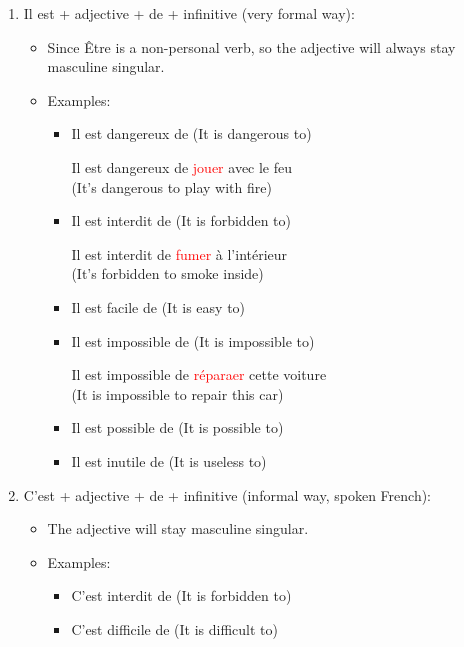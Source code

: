 \documentclass{book}
\begin{document}
\begin{enumerate}
    \item Il est + adjective + de + infinitive (very formal way):
    \begin{itemize}
        \item Since Être is a non-personal verb, so the adjective will always stay masculine singular.
        \item Examples:
        \begin{itemize}
            \item Il est dangereux de (It is dangerous to)
            \begin{center}
                Il est dangereux de \textcolor{red}{jouer} avec le feu \\
                (It's dangerous to play with fire)  
            \end{center}
            \item Il est interdit de (It is forbidden to)
            \begin{center}
                Il est interdit de \textcolor{red}{fumer} à l'intérieur \\
                (It's forbidden to smoke inside)
            \end{center}
            \item Il est facile de (It is easy to)
            \item Il est impossible de (It is impossible to) 
            \begin{center}
                Il est impossible de \textcolor{red}{réparaer} cette voiture \\
                (It is impossible to repair this car)
            \end{center}
            \item Il est possible de (It is possible to)
            \item Il est inutile de (It is useless to)
        \end{itemize}
    \end{itemize}
    \item C'est  + adjective + de + infinitive (informal way, spoken French):
    \begin{itemize}
        \item The adjective will stay masculine singular.
        \item Examples:
        \begin{itemize}
            \item C'est interdit de (It is forbidden to)
            \item C'est difficile de (It is difficult to)

\end{itemize}
\end{itemize}
\end{enumerate}
\end{document}

